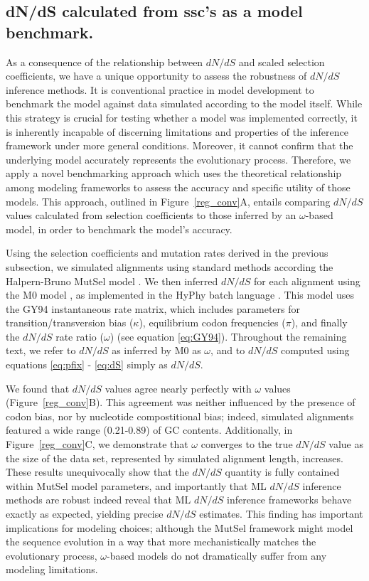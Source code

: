 \documentclass{pnastwo}
\begin{document}
\begin{article}
\subsection*{dN/dS calculated from ssc's as a model benchmark.}

As a consequence of the relationship between $dN/dS$ and scaled selection coefficients, we have a unique opportunity to assess the robustness of $dN/dS$ inference methods. It is conventional practice in model development to benchmark the model against data simulated according to the model itself. While this strategy is crucial for testing whether a model was implemented correctly, it is inherently incapable of discerning limitations and properties of the inference framework under more general conditions. Moreover, it cannot confirm that the underlying model accurately represents the evolutionary process. Therefore, we apply a novel benchmarking approach which uses the theoretical relationship among modeling frameworks to assess the accuracy and specific utility of those models. This approach, outlined in Figure~\ref{reg_conv}A, entails comparing $dN/dS$ values calculated from selection coefficients to those inferred by an $\omega$-based model, in order to benchmark the model's accuracy.

Using the selection coefficients and mutation rates derived in the previous subsection, we simulated alignments using standard methods \cite{Yang2006} according the Halpern-Bruno MutSel model \cite{HalpernBruno1998}. We then inferred $dN/dS$ for each alignment using the M0 model \cite{GoldmanYang1994,Yangetal2000}, as implemented in the HyPhy batch language \cite{KosakovskyPondetal2005}. This model uses the GY94 instantaneous rate matrix, which includes parameters for transition/transversion bias ($\kappa$), equilibrium codon frequencies ($\pi$), and finally the $dN/dS$ rate ratio ($\omega$) (see equation \eqref{eq:GY94}). Throughout the remaining text, we refer to $dN/dS$ as inferred by M0 as $\omega$, and to $dN/dS$ computed using equations \eqref{eq:pfix} - \eqref{eq:dS} simply as $dN/dS$. 

We found that $dN/dS$ values agree nearly perfectly with $\omega$ values (Figure~\ref{reg_conv}B). This agreement was neither influenced by the presence of codon bias, nor by nucleotide compostitional bias; indeed, simulated alignments featured a wide range (0.21-0.89) of GC contents. Additionally, in Figure~\ref{reg_conv}C, we demonstrate that $\omega$ converges to the true $dN/dS$ value as the size of the data set, represented by simulated alignment length, increases. These results unequivocally show that the $dN/dS$ quantity is fully contained within MutSel model parameters, and importantly that ML $dN/dS$ inference methods are robust indeed reveal that ML $dN/dS$ inference frameworks behave exactly as expected, yielding precise $dN/dS$ estimates. This finding has important implications for modeling choices; although the MutSel framework might model the sequence evolution in a way that more mechanistically matches the evolutionary process, $\omega$-based models do not dramatically suffer from any modeling limitations. 


\end{article}
\end{document}
